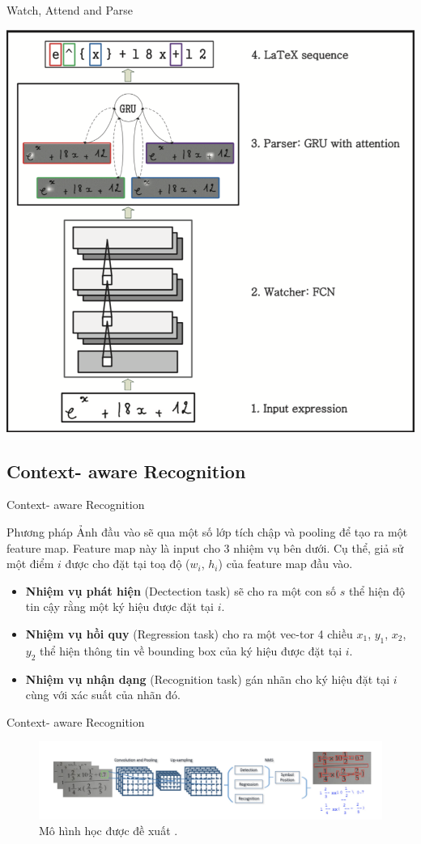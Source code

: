 \documentclass{beamer}
\begin{document}
\begin{frame}{Watch, Attend and Parse}
\begin{center}
	\centering
	\includegraphics[width=0.5\linewidth]{WAP}
	\vspace{0.5cm}
\end{center}
\end{frame}
\subsection{Context- aware Recognition}
\begin{frame}{Context- aware Recognition}
	\begin{block}{Phương pháp}
		Ảnh đầu vào sẽ qua một số lớp tích chập và pooling để tạo ra một feature map. Feature map này là input cho 3 nhiệm vụ bên dưới. Cụ thể,
		giả sử một điểm $i$ được cho đặt tại toạ độ ($w_i$, $h_i$) của feature map đầu vào. 
		\begin{itemize}
			\item \textbf{Nhiệm vụ phát hiện} (Dectection task) sẽ cho ra một con số $s$ thể hiện độ tin cậy rằng một ký hiệu được đặt tại $i$.
			\item \textbf{Nhiệm vụ hồi quy} (Regression task) cho ra một vec-tor 4 chiều {$x_1$, $y_1$, $x_2$, $y_2$} thể hiện thông tin về bounding box của ký hiệu được đặt tại $i$.
			\item\textbf{Nhiệm vụ nhận dạng} (Recognition task) gán nhãn cho ký hiệu đặt tại $i$ cùng với xác suất của nhãn đó. 
		\end{itemize}
		
	\end{block}
\end{frame}

\begin{frame}{Context- aware Recognition}
	\begin{figure}[!h]
		\centering
		\includegraphics[width=0.9\linewidth]{context_aware.png}
		\vspace{0.2cm}
		\caption{Mô hình học được đề xuất .}
	\end{figure}
\end{frame}
\end{document}
